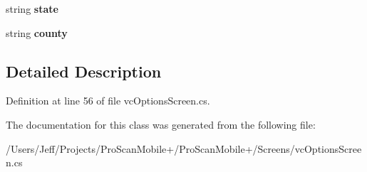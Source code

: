 \begin{DoxyCompactItemize}
\item 
\hypertarget{class_pro_scan_mobile_1_1vc_options_screen_1_1_server_details_a651086eb83f2e749f8dc415436a55d40}{string {\bfseries state}}\label{class_pro_scan_mobile_1_1vc_options_screen_1_1_server_details_a651086eb83f2e749f8dc415436a55d40}

\item 
\hypertarget{class_pro_scan_mobile_1_1vc_options_screen_1_1_server_details_aa92f63735ffeee1b3aaaa7fd04cd0c67}{string {\bfseries county}}\label{class_pro_scan_mobile_1_1vc_options_screen_1_1_server_details_aa92f63735ffeee1b3aaaa7fd04cd0c67}

\end{DoxyCompactItemize}


\subsection{Detailed Description}


Definition at line 56 of file vc\-Options\-Screen.\-cs.



The documentation for this class was generated from the following file\-:\begin{DoxyCompactItemize}
\item 
/\-Users/\-Jeff/\-Projects/\-Pro\-Scan\-Mobile+/\-Pro\-Scan\-Mobile+/\-Screens/vc\-Options\-Screen.\-cs\end{DoxyCompactItemize}
